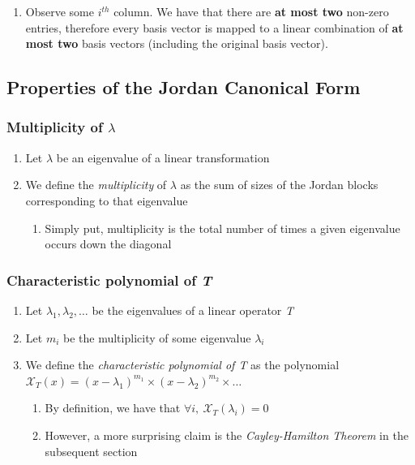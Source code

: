\documentclass{article}
\begin{document}
\begin{enumerate}[label*=\arabic*.]
    \begin{enumerate}[label*=\arabic*.]
        \item Observe some $i^{th}$ column. We have that there are \textbf{at most two} non-zero entries, therefore every basis vector is mapped to a linear combination
                of \textbf{at most two} basis vectors (including the original basis vector).
    \end{enumerate}
\end{enumerate}

\subsection{Properties of the Jordan Canonical Form}

\subsubsection{Multiplicity of $\lambda$}

\begin{enumerate}[label*=\arabic*.]
    \item Let $\lambda$ be an eigenvalue of a linear transformation
    \item We define the \textit{multiplicity} of $\lambda$ as the sum of sizes of the Jordan blocks corresponding to that eigenvalue
        \begin{enumerate}[label*=\arabic*.]
            \item Simply put, multiplicity is the total number of times a given eigenvalue occurs down the diagonal
        \end{enumerate}
\end{enumerate}


\subsubsection{Characteristic polynomial of \textit{T}}
\begin{enumerate}[label*=\arabic*.]
    \item Let $\lambda_{1}, \lambda_{2}, \dots$ be the eigenvalues of a linear operator \textit{T}
    \item Let $m_{i}$ be the multiplicity of some eigenvalue $\lambda_{i}$
    \item We define the \textit{characteristic polynomial of T} as the polynomial $\mathcal{X}_{T}(x) = (x-\lambda_{1})^{m_{1}} \times (x-\lambda_{2})^{m_{2}} \times \dots$
        \begin{enumerate}[label*=\arabic*.]
            \item By definition, we have that $\forall i,\ \mathcal{X}_{T}(\lambda_{i}) = 0$
            \item However, a more surprising claim is the \textit{Cayley-Hamilton Theorem} in the subsequent section
        \end{enumerate}
\end{enumerate}
\end{document}
